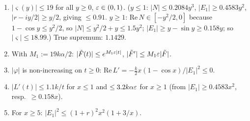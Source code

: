 \begin{lemma}\label{lem:elem}\Pt{}
\begin{enumerate}[label=(\alph*),nosep]
\item $|\varsigma(y)|\le19$ for all $y\ge0$, $\varepsilon\in(0,1)$. ($y\le1$: $|N|\le0.2084y^3$, $|E_1|\ge0.4583y^2$, $|r-iy/2|\ge y/2$, giving $\le0.91$. $y\ge1$: $\mathrm{Re}\,N\in[-y^2/2,0]$ because $1-\cos y\le y^2/2$, so $|N|\le y^2/2+y\le1.5y^2$; $|E_1|\ge y-\sin y\ge0.158y$; so $|\varsigma|\le18.99$.) True supremum: $1.1429$.
\item With $M_1:=19k\alpha/2$: $|\tilde F(t)|\le e^{M_1\varepsilon|t|}$, $|\tilde F'|\le M_1\varepsilon|\tilde F|$.
\item $|\varphi|$ is non-increasing on $t\ge0$: $\mathrm{Re}\,L'=-\frac k2x(1-\cos x)/|E_1|^2\le0$.
\item $|L'(t)|\le1.1k/t$ for $x\le1$ and $\le3.2k\alpha\varepsilon$ for $x\ge1$ (from $|E_1|\ge0.4583x^2$, resp.\ $\ge0.158x$).
\item For $x\ge5$: $|E_1|^2\le(1+r)^2x^2(1+3/x)$.
\end{enumerate}
\end{lemma}

